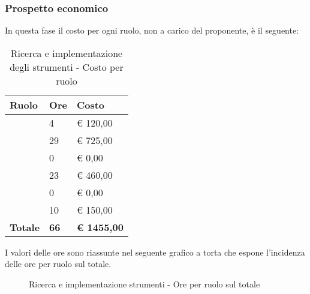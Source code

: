 		\subsubsection{Prospetto economico} %
		\label{ssub:prospetto_economico}
		In questa fase il costo per ogni ruolo, non a carico del proponente, è il seguente: \\
			\begin{table}[!htt]
				\begin{center}
					\begin{tabularx}{0.65\textwidth}{|l|l|X|}
						\hline
						\textbf{Ruolo} & \textbf{Ore} & \textbf{Costo} \\
						\hline
						\roleProjectManager & 4 & \euro{} 120,00 \\
						\hline
						\roleAnalyst & 29 & \euro{} 725,00 \\
						\hline
						\roleDesigner & 0 & \euro{} 0,00 \\
						\hline
						\roleAdministrator & 23 & \euro{} 460,00 \\
						\hline
						\roleProgrammer & 0 & \euro{} 0,00 \\
						\hline
						\roleVerifier & 10 & \euro{} 150,00 \\
						\hline
						\textbf{Totale} & \textbf{66} & \textbf{\euro{} 1455,00} \\
						\hline
					\end{tabularx}
				\end{center}
			\caption{Ricerca e implementazione degli strumenti - Costo per ruolo}
			\end{table}

		\noindent
		I valori delle ore sono riassunte nel seguente grafico a torta che espone l’incidenza delle ore per ruolo sul totale.
		\begin{center}
			\begin{figure}[htbp]
			\vspace{0.8cm}
			\caption{Ricerca e implementazione strumenti - Ore per ruolo sul totale}
			\end{figure}
		\end{center}
		
